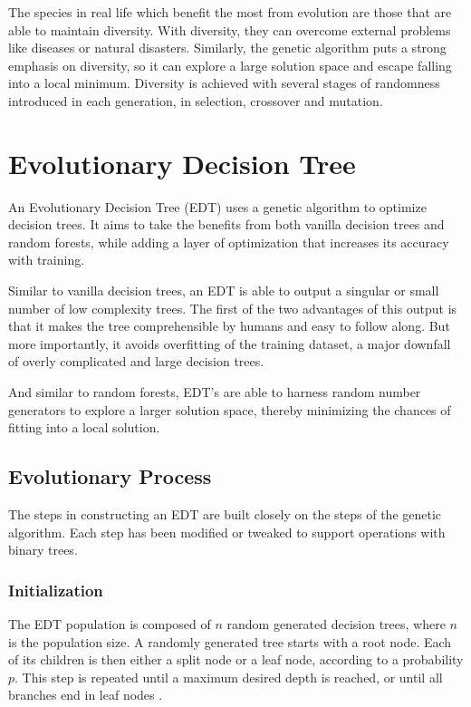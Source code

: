 \documentclass[12pt]{article}
\begin{document}
The species in real life which benefit the most from evolution are those that are able to maintain diversity. With diversity, they can overcome external problems like diseases or natural disasters. Similarly, the genetic algorithm puts a strong emphasis on diversity, so it can explore a large solution space and escape falling into a local minimum. Diversity is achieved with several stages of randomness introduced in each generation, in selection, crossover and mutation.

\section{Evolutionary Decision Tree}

An Evolutionary Decision Tree (EDT) uses a genetic algorithm to optimize decision trees. It aims to take the benefits from both vanilla decision trees and random forests, while adding a layer of optimization that increases its accuracy with training.

Similar to vanilla decision trees, an EDT is able to output a singular or small number of low complexity trees. The first of the two advantages of this output is that it makes the tree comprehensible by humans and easy to follow along. But more importantly, it avoids overfitting of the training dataset, a major downfall of overly complicated and large decision trees.

And similar to random forests, EDT's are able to harness random number generators to explore a larger solution space, thereby minimizing the chances of fitting into a local solution.

\subsection{Evolutionary Process}

The steps in constructing an EDT are built closely on the steps of the genetic algorithm. Each step has been modified or tweaked to support operations with binary trees.

\subsubsection{Initialization}

The EDT population is composed of $n$ random generated decision trees, where $n$ is the population size. A randomly generated tree starts with a root node. Each of its children is then either a split node or a leaf node, according to a probability $p$. This step is repeated until a maximum desired depth is reached, or until all branches end in leaf nodes \cite{faik_2020}.
\end{document}
